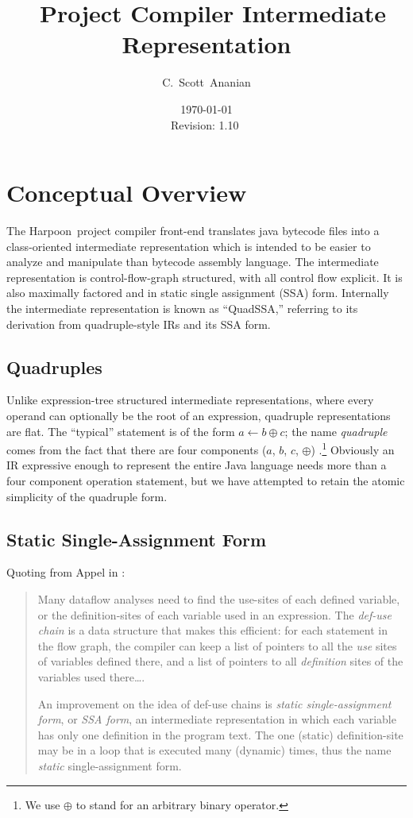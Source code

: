 \documentclass[11pt,notitlepage,twocolumn,twoside]{article}
\author{C.~Scott~Ananian}
\title{\Harpoon\ Project Compiler Intermediate Representation}
\date{\today \\ $ $Revision: 1.10 $ $}
\newcommand{\Harpoon}{Harpoon}%
\begin{document}

\maketitle

\section{Conceptual Overview}

The \Harpoon\ project compiler front-end translates java bytecode files
into a class-oriented intermediate representation which is intended to
be easier to analyze and manipulate than bytecode assembly language.
The intermediate representation is control-flow-graph structured, with
all control flow explicit.  It is also maximally factored and in
static single assignment (SSA) form.  Internally the intermediate
representation is known as ``QuadSSA,'' referring
to its derivation from quadruple-style IRs and its SSA form.

\subsection{Quadruples}
Unlike expression-tree structured intermediate representations, where
every operand can optionally be the root of an expression, quadruple
representations are flat.  The ``typical'' statement is of the form
$a \leftarrow b \oplus c$; the name \textit{quadruple} comes from the fact
that there are four components ($a$, $b$, $c$, $\oplus$)
\cite{appel:modern}.\footnote{We use $\oplus$ to stand for an arbitrary
binary operator.}  Obviously an IR expressive enough to represent the
entire Java language needs more than a four component operation
statement, but we have attempted to retain the atomic simplicity
of the quadruple form.

\subsection{Static Single-Assignment Form}

Quoting from Appel in \cite{appel:modern}:
\begin{quote}
Many dataflow analyses need to find the use-sites of each defined
variable, or the definition-sites of each variable used in an
expression.  The \textit{def-use chain} is a data structure that makes
this efficient: for each statement in the flow graph, the compiler can
keep a list of pointers to all the \textit{use} sites of variables
defined there, and a list of pointers to all \textit{definition} sites
of the variables used there\ldots .

An improvement on the idea of def-use chains is \textit{static
single-assignment form}, or \textit{SSA form}, an intermediate
representation in which each variable has only one definition in the
program text.  The one (static) definition-site may be in a loop that
is executed many (dynamic) times, thus the name \textit{static}
single-assignment form.
\end{quote}
\end{document}
